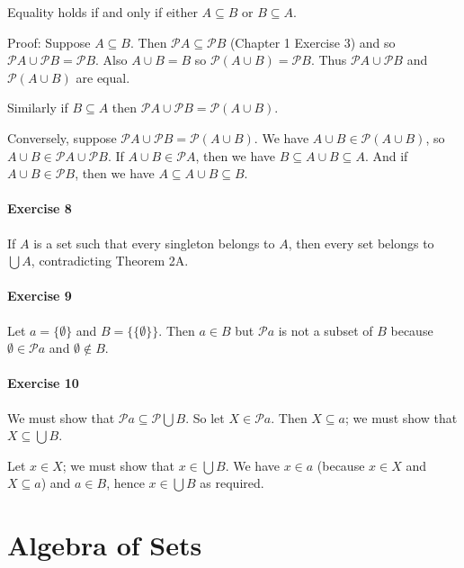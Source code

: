 \documentclass{report}
\begin{document}
    Equality holds if and only if either $A \subseteq B$ or $B \subseteq A$.

    Proof: Suppose $A \subseteq B$. Then $\mathcal{P} A \subseteq \mathcal{P} B$ (Chapter 1 Exercise 3)
    and so $\mathcal{P} A \cup \mathcal{P} B = \mathcal{P} B$. Also $A \cup B = B$ so $\mathcal{P} (A \cup B)
    = \mathcal{P} B$. Thus $\mathcal{P} A \cup \mathcal{P} B$ and $\mathcal{P} (A \cup B)$ are equal.

    Similarly if $B \subseteq A$ then $\mathcal{P} A \cup \mathcal{P} B = \mathcal{P} (A \cup B)$.

    Conversely, suppose $\mathcal{P} A \cup \mathcal{P} B = \mathcal{P} (A \cup B)$. We have $A \cup B
    \in \mathcal{P} (A \cup B)$, so $A \cup B \in \mathcal{P} A \cup \mathcal{P} B$. If $A \cup B \in \mathcal{P}
    A$, then we have $B \subseteq A \cup B \subseteq A$. And if $A \cup B \in \mathcal{P} B$, then we have
    $A \subseteq A \cup B \subseteq B$.

    \paragraph{Exercise 8}
    If $A$ is a set such that every singleton belongs to $A$, then every set belongs to $\bigcup A$,
    contradicting Theorem 2A.

    \paragraph{Exercise 9}
    Let $a = \{ \emptyset \}$ and $B = \{ \{ \emptyset \} \}$. Then $a \in B$ but $\mathcal{P} a$
    is not a subset of $B$ because $\emptyset \in \mathcal{P} a$ and $\emptyset \notin B$.

    \paragraph{Exercise 10}
    We must show that $\mathcal{P} a \subseteq \mathcal{P} \bigcup B$. So let $X \in \mathcal{P} a$.
    Then $X \subseteq a$; we must show that $X \subseteq \bigcup B$.

    Let $x \in X$; we must show  that $x \in \bigcup B$. We have $x \in a$ (because $x \in X$ and $X \subseteq a$)
    and $a \in B$, hence $x \in \bigcup B$ as required.

    \section{Algebra of Sets}
\end{document}
